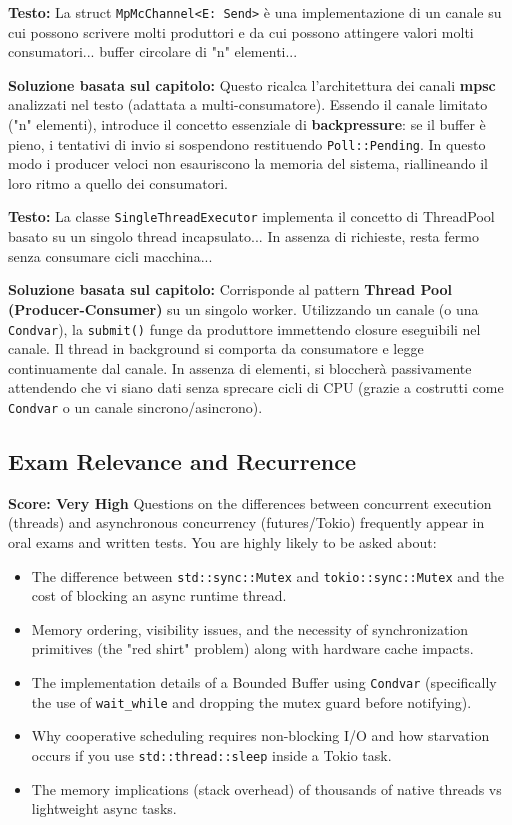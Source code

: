 \begin{exambox}
\textbf{Testo:} La struct \texttt{MpMcChannel<E: Send>} è una implementazione di un canale su cui possono scrivere molti produttori e da cui possono attingere valori molti consumatori... buffer circolare di "n" elementi...

\textbf{Soluzione basata sul capitolo:} Questo ricalca l'architettura dei canali \textbf{mpsc} analizzati nel testo (adattata a multi-consumatore). Essendo il canale limitato ("n" elementi), introduce il concetto essenziale di \textbf{backpressure}: se il buffer è pieno, i tentativi di invio si sospendono restituendo \texttt{Poll::Pending}. In questo modo i producer veloci non esauriscono la memoria del sistema, riallineando il loro ritmo a quello dei consumatori.
\end{exambox}

\begin{exambox}
\textbf{Testo:} La classe \texttt{SingleThreadExecutor} implementa il concetto di ThreadPool basato su un singolo thread incapsulato... In assenza di richieste, resta fermo senza consumare cicli macchina...

\textbf{Soluzione basata sul capitolo:} Corrisponde al pattern \textbf{Thread Pool (Producer-Consumer)} su un singolo worker. Utilizzando un canale (o una \texttt{Condvar}), la \texttt{submit()} funge da produttore immettendo closure eseguibili nel canale. Il thread in background si comporta da consumatore e legge continuamente dal canale. In assenza di elementi, si bloccherà passivamente attendendo che vi siano dati senza sprecare cicli di CPU (grazie a costrutti come \texttt{Condvar} o un canale sincrono/asincrono).
\end{exambox}

\subsection*{Exam Relevance and Recurrence}
\textbf{Score: Very High}
Questions on the differences between concurrent execution (threads) and asynchronous concurrency (futures/Tokio) frequently appear in oral exams and written tests. You are highly likely to be asked about:
\begin{itemize}
    \item The difference between \texttt{std::sync::Mutex} and \texttt{tokio::sync::Mutex} and the cost of blocking an async runtime thread.
    \item Memory ordering, visibility issues, and the necessity of synchronization primitives (the "red shirt" problem) along with hardware cache impacts.
    \item The implementation details of a Bounded Buffer using \texttt{Condvar} (specifically the use of \texttt{wait\_while} and dropping the mutex guard before notifying).
    \item Why cooperative scheduling requires non-blocking I/O and how starvation occurs if you use \texttt{std::thread::sleep} inside a Tokio task.
    \item The memory implications (stack overhead) of thousands of native threads vs lightweight async tasks.
\end{itemize}
